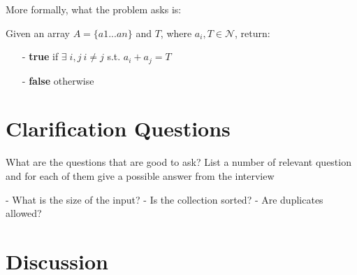 More formally, what the problem asks is:
\begin{exercise}
	Given an array $A=\{a1...an\}$ and $T$, where $a_i, T \in \mathcal{N}$, return:
	\begin{itemize}
		\item[-] \textbf{true }if $\exists \;i,j \: i \neq j$ s.t. $a_i+a_j = T$
		\item[-] \textbf{false} otherwise
	\end{itemize}
\end{exercise}	
	

\section{Clarification Questions}
What are the questions that are good to ask?
List a number of relevant question and for each of them give a possible answer from the interview

- What is the size of the input?
- Is the collection sorted?
- Are duplicates allowed?


\section{Discussion}


